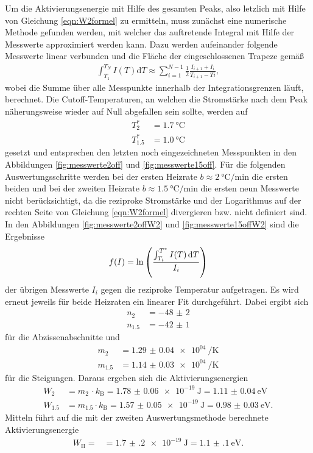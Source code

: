 Um die Aktivierungsenergie mit Hilfe des gesamten Peaks, also letzlich mit Hilfe
von Gleichung \ref{eqn:W2formel} zu ermitteln, muss zunächst eine numerische Methode
gefunden werden, mit welcher das auftretende Integral mit Hilfe der Messwerte
approximiert werden kann. Dazu werden aufeinander folgende Messwerte linear
verbunden und die Fläche der eingeschlossenen Trapeze gemäß
\begin{align}
  \int_{T_1}^{T_N} I(T) \mathrm{d}T \approx \sum_{i=1}^{N-1} \frac12 \frac{I_{i+1}+I_{i}}{T_{i+1}-T{i}},
\end{align}
wobei die Summe über alle Messpunkte innerhalb der Integrationsgrenzen läuft, berechnet.
Die Cutoff-Temperaturen, an welchen die Stromstärke nach dem Peak näherungsweise wieder auf Null
abgefallen sein sollte, werden auf
\begin{align}
  T^*_{2} &= \SI{1.7}{\celsius} \\
  T^*_{1.5} &= \SI{1.0}{\celsius}
\end{align}
gesetzt und entsprechen den letzten noch eingezeichneten Messpunkten in den Abbildungen
\ref{fig:messwerte2off} und \ref{fig:messwerte15off}. Für die folgenden Auswertungsschritte
werden bei der ersten Heizrate $b \approx \SI{2}{\celsius\per\minute}$ die ersten beiden
und bei der zweiten Heizrate $b \approx \SI{1.5}{\celsius\per\minute}$ die ersten neun Messwerte
nicht berücksichtigt, da die reziproke Stromstärke und der Logarithmus auf der rechten Seite
von Gleichung \eqref{eqn:W2formel} divergieren bzw. nicht definiert sind.
In den Abbildungen \ref{fig:messwerte2offW2} und \ref{fig:messwerte15offW2} sind die Ergebnisse
\begin{align}
  f(I) = \ln \left(\frac{\int_{T_i}^{T^*} I(T)\mathop{}\!\mathrm{d} T}{I_i}\right)
  \label{eqn:auftrag}
\end{align}
der übrigen Messwerte $I_{i}$ gegen die reziproke Temperatur aufgetragen. Es wird erneut
jeweils für beide Heizraten ein linearer Fit durchgeführt. Dabei ergibt sich
\begin{align}
  n_{2} &= \num{-48(2)} \\
  n_{1.5} &= \num{-42(1)}
\end{align}
für die Abzissenabschnitte und
\begin{align}
  m_{2} &= \SI{1.29(4)e04}{\per\kelvin} \\
  m_{1.5} &= \SI{1.14(3)e04}{\per\kelvin}
\end{align}
für die Steigungen. Daraus ergeben sich die Aktivierungsenergien
\begin{align}
  W_{2} &= m_{2} \, \cdot k_\text{B} = \SI{1.78(6)e-19}{\joule} = \SI{1.11(4)}{\electronvolt} \\
  W_{1.5} &= m_{1.5} \cdot k_\text{B} = \SI{1.57(5)e-19}{\joule} = \SI{0.98(3)}{\electronvolt}.
\end{align}
Mitteln führt auf die mit der zweiten Auswertungsmethode berechnete Aktivierungsenergie
\begin{align}
  W_{\text{II}} = &= \SI{1.7(2)e-19}{\joule} = \SI{1.1(1)}{\electronvolt}.
\label{eqn:akt2}
\end{align}

